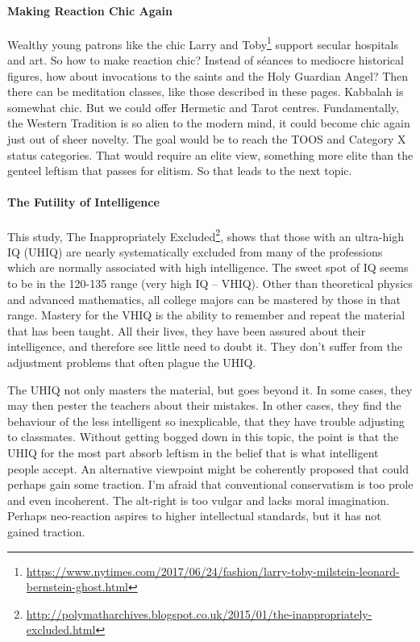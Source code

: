 \paragraph{Making Reaction Chic Again}


Wealthy young patrons like the chic Larry and Toby\footnote{\url{https://www.nytimes.com/2017/06/24/fashion/larry-toby-milstein-leonard-bernstein-ghost.html}} support secular hospitals and art. So how to make reaction chic? Instead of séances to mediocre historical figures, how about invocations to the saints and the Holy Guardian Angel? Then there can be meditation classes, like those described in these pages. Kabbalah is somewhat chic. But we could offer Hermetic and Tarot centres. Fundamentally, the Western Tradition is so alien to the modern mind, it could become chic again just out of sheer novelty. The goal would be to reach the TOOS and Category X status categories. That would require an elite view, something more elite than the genteel leftism that passes for elitism. So that leads to the next topic.

\paragraph{The Futility of Intelligence}


This study, The Inappropriately Excluded\footnote{\url{http://polymatharchives.blogspot.co.uk/2015/01/the-inappropriately-excluded.html}}, shows that those with an ultra-high IQ (UHIQ) are nearly systematically excluded from many of the professions which are normally associated with high intelligence. The sweet spot of IQ seems to be in the 120-135 range (very high IQ -- VHIQ). Other than theoretical physics and advanced mathematics, all college majors can be mastered by those in that range. Mastery for the VHIQ is the ability to remember and repeat the material that has been taught. All their lives, they have been assured about their intelligence, and therefore see little need to doubt it. They don't suffer from the adjustment problems that often plague the UHIQ.

The UHIQ not only masters the material, but goes beyond it. In some cases, they may then pester the teachers about their mistakes. In other cases, they find the behaviour of the less intelligent so inexplicable, that they have trouble adjusting to classmates. Without getting bogged down in this topic, the point is that the UHIQ for the most part absorb leftism in the belief that is what intelligent people accept. An alternative viewpoint might be coherently proposed that could perhaps gain some traction. I'm afraid that conventional conservatism is too prole and even incoherent. The alt-right is too vulgar and lacks moral imagination. Perhaps neo-reaction aspires to higher intellectual standards, but it has not gained traction.

